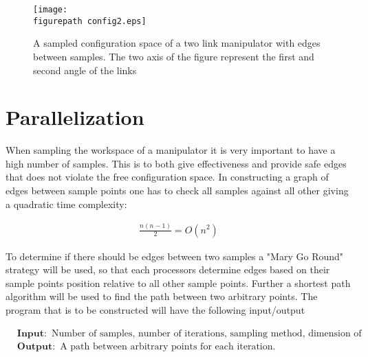 \begin{figure}[h!] 
 \center 
 \texttt{[image: \\figurepath config2.eps]}
 \caption{ A sampled configuration space of a two link manipulator with edges between samples. The two axis of the figure represent the first and second angle of the links \label{fig:c1}}
 \end{figure}



\section*{Parallelization}
When sampling the workspace of a manipulator it is very important to have a high number of samples. This is to both give effectiveness and provide safe edges that does not violate the free configuration space. In constructing a graph of edges between sample points one has to check all samples against all other giving a quadratic time complexity:

\begin{align}
\label{eq:}
 \frac{n(n-1)}{2}=O(n^2) 
 \end{align}

To determine if there should be edges between two samples a "Mary Go Round" strategy will be used, so that each processors determine edges based on their sample points position relative to all other sample points. Further a shortest path algorithm will be used to find the path between two arbitrary points. 
The program that is to be constructed will have the following input/output

\begin{align}
\label{eq:}
&\mathbf{Input: } \text{ Number of samples, number of iterations, sampling method, dimension of configuration space. } \nonumber \\
 &\mathbf{Output: } \text{ A path between arbitrary points for each iteration.} \nonumber
 \end{align}










